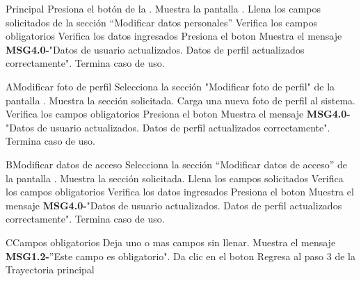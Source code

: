 	\begin{UCtrayectoria}{Principal}
	\UCpaso[\UCactor] Presiona el botón  de la .
	\UCpaso Muestra la pantalla .
	\UCpaso[\UCactor] Llena los campos solicitados de la sección ``Modificar datos personales''  
	\UCpaso Verifica los campos obligatorios  
	\UCpaso Verifica los datos ingresados    
	\UCpaso[\UCactor] Presiona el boton  
	\UCpaso Muestra el mensaje {\bf MSG4.0-}"Datos de usuario actualizados. Datos de perfil actualizados correctamente".
	\UCpaso Termina caso de uso.
\end{UCtrayectoria}

\begin{UCtrayectoriaA}{A}{Modificar foto de perfil}
	\UCpaso[\UCactor] Selecciona la sección "Modificar foto de perfil" de la pantalla .
	\UCpaso Muestra la sección solicitada.
	\UCpaso[\UCactor] Carga una nueva foto de perfil al sistema.
	\UCpaso Verifica los campos obligatorios  
	\UCpaso[\UCactor] Presiona el boton  
	\UCpaso Muestra el mensaje {\bf MSG4.0-}"Datos de usuario actualizados. Datos de perfil actualizados correctamente".
	\UCpaso Termina caso de uso.
\end{UCtrayectoriaA}

\begin{UCtrayectoriaA}{B}{Modificar datos de acceso}
	\UCpaso[\UCactor] Selecciona la sección ``Modificar datos de acceso'' de la pantalla .
	\UCpaso Muestra la sección solicitada.
	\UCpaso[\UCactor] Llena los campos solicitados  
	\UCpaso Verifica los campos obligatorios  
	\UCpaso Verifica los datos ingresados      
	\UCpaso[\UCactor] Presiona el boton  
	\UCpaso Muestra el mensaje {\bf MSG4.0-}"Datos de usuario actualizados. Datos de perfil actualizados correctamente".
	\UCpaso Termina caso de uso.
\end{UCtrayectoriaA}


\begin{UCtrayectoriaA}{C}{Campos obligatorios}
	\UCpaso[\UCactor] Deja uno o mas campos sin llenar.
	\UCpaso Muestra el mensaje {\bf MSG1.2-}''Este campo es obligatorio".
	\UCpaso[\UCactor] Da clic en el boton 
	\UCpaso Regresa al paso 3 de la Trayectoria principal
\end{UCtrayectoriaA}

